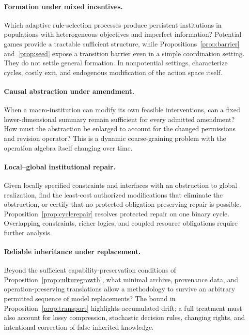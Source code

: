 \documentclass[11pt,letterpaper]{article}
\theoremstyle{plain}
\theoremstyle{definition}
\theoremstyle{remark}
\begin{document}
\paragraph{Formation under mixed incentives.}
Which adaptive rule-selection processes produce persistent institutions in populations with heterogeneous objectives and imperfect information? Potential games provide a tractable sufficient structure, while Propositions~\ref{prop:barrier} and~\ref{prop:seed} expose a transition barrier even in a simple coordination setting. They do not settle general formation. In nonpotential settings, characterize cycles, costly exit, and endogenous modification of the action space itself.

\paragraph{Causal abstraction under amendment.}
When a macro-institution can modify its own feasible interventions, can a fixed lower-dimensional summary remain sufficient for every admitted amendment? How must the abstraction be enlarged to account for the changed permissions and revision operator? This is a dynamic coarse-graining problem with the operation algebra itself changing over time.

\paragraph{Local--global institutional repair.}
Given locally specified constraints and interfaces with an obstruction to global realization, find the least-cost authorized modifications that eliminate the obstruction, or certify that no protected-obligation-preserving repair is possible. Proposition~\ref{prop:cyclerepair} resolves protected repair on one binary cycle. Overlapping constraints, richer logics, and coupled resource obligations require further analysis.

\paragraph{Reliable inheritance under replacement.}
Beyond the sufficient capability-preservation conditions of Proposition~\ref{prop:culturegrowth}, what minimal archive, provenance data, and operation-preserving translations allow a methodology to survive an arbitrary permitted sequence of model replacements? The bound in Proposition~\ref{prop:transport} highlights accumulated drift; a full treatment must also account for lossy compression, stochastic decision rules, changing rights, and intentional correction of false inherited knowledge.
\end{document}

